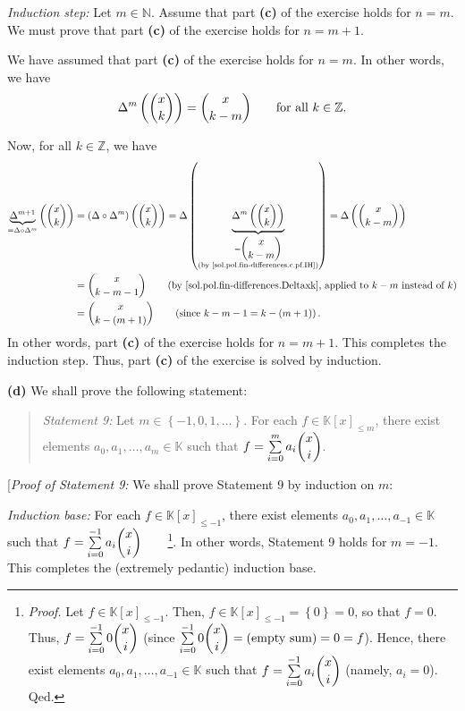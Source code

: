 \documentclass[paper=a4, fontsize=12pt]{scrartcl}%
\let\sumnonlimits\sum
\renewcommand{\sum}{\sumnonlimits\limits}
\theoremstyle{plainsl}
\theoremstyle{definition}
\theoremstyle{remark}
\newenvironment{statement}{\begin{quote}}{\end{quote}}
\begin{document}
\textit{Induction step:} Let $m\in\mathbb{N}$. Assume that part \textbf{(c)}
of the exercise holds for $n=m$. We must prove that part \textbf{(c)} of the
exercise holds for $n=m+1$.

We have assumed that part \textbf{(c)} of the exercise holds for $n=m$. In
other words, we have%
\begin{equation}
\Delta^{m}\left(  \dbinom{x}{k}\right)  =\dbinom{x}{k-m}\qquad\text{for all
}k\in\mathbb{Z}. \label{sol.pol.fin-differences.c.pf.IH}%
\end{equation}


Now, for all $k\in\mathbb{Z}$, we have
\begin{align*}
\underbrace{\Delta^{m+1}}_{=\Delta\circ\Delta^{m}}\left(  \dbinom{x}%
{k}\right)   &  =\left(  \Delta\circ\Delta^{m}\right)  \left(  \dbinom{x}%
{k}\right)  =\Delta\left(  \underbrace{\Delta^{m}\left(  \dbinom{x}{k}\right)
}_{\substack{=\dbinom{x}{k-m}\\\text{(by
\eqref{sol.pol.fin-differences.c.pf.IH})}}}\right)  =\Delta\left(  \dbinom
{x}{k-m}\right) \\
&  =\dbinom{x}{k-m-1}\qquad\left(  \text{by
\eqref{sol.pol.fin-differences.Deltaxk}, applied to }k-m\text{ instead of
}k\right) \\
&  =\dbinom{x}{k-\left(  m+1\right)  }\qquad\left(  \text{since }%
k-m-1=k-\left(  m+1\right)  \right)  .
\end{align*}
In other words, part \textbf{(c)} of the exercise holds for $n=m+1$. This
completes the induction step. Thus, part \textbf{(c)} of the exercise is
solved by induction.

\bigskip

\textbf{(d)} We shall prove the following statement:

\begin{statement}
\textit{Statement 9:} Let $m\in\left\{  -1,0,1,\ldots\right\}  $. For each
$f\in\mathbb{K}\left[  x\right]  _{\leq m}$, there exist elements $a_{0}%
,a_{1},\ldots,a_{m}\in\mathbb{K}$ such that $f=\sum_{i=0}^{m}a_{i}\dbinom
{x}{i}$.
\end{statement}

[\textit{Proof of Statement 9:} We shall prove Statement 9 by induction on
$m$:

\textit{Induction base:} For each $f\in\mathbb{K}\left[  x\right]  _{\leq-1}$,
there exist elements $a_{0},a_{1},\ldots,a_{-1}\in\mathbb{K}$ such that
$f=\sum_{i=0}^{-1}a_{i}\dbinom{x}{i}$\ \ \ \ \footnote{\textit{Proof.} Let
$f\in\mathbb{K}\left[  x\right]  _{\leq-1}$. Then, $f\in\mathbb{K}\left[
x\right]  _{\leq-1}=\left\{  0\right\}  =0$, so that $f=0$. Thus,
$f=\sum_{i=0}^{-1}0\dbinom{x}{i}$ (since $\sum_{i=0}^{-1}0\dbinom{x}%
{i}=\left(  \text{empty sum}\right)  =0=f$). Hence, there exist elements
$a_{0},a_{1},\ldots,a_{-1}\in\mathbb{K}$ such that $f=\sum_{i=0}^{-1}%
a_{i}\dbinom{x}{i}$ (namely, $a_{i}=0$). Qed.}. In other words, Statement 9
holds for $m=-1$. This completes the (extremely pedantic) induction base.
\end{document}
